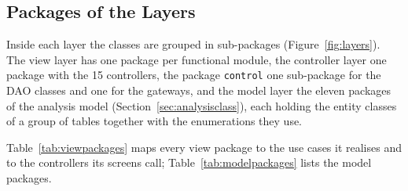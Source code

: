 \subsection{Packages of the Layers}
\label{subsec:packages}
Inside each layer the classes are grouped in sub-packages (Figure~\ref{fig:layers}). The view layer has one package per functional module, the controller layer one package with the 15 controllers, the package \texttt{control} one sub-package for the DAO classes and one for the gateways, and the model layer the eleven packages of the analysis model (Section~\ref{sec:analysisclass}), each holding the entity classes of a group of tables together with the enumerations they use.


Table~\ref{tab:viewpackages} maps every view package to the use cases it realises and to the controllers its screens call; Table~\ref{tab:modelpackages} lists the model packages.


